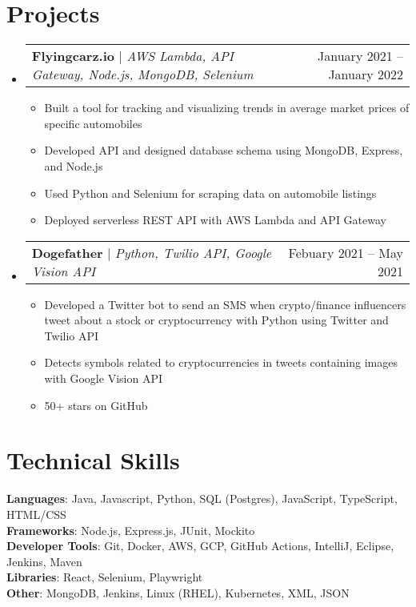 \documentclass[letterpaper,11pt]{article}
\makeatletter
\newcommand{\resumeItem}[1]{
  \item\small{
    {#1 \vspace{-2pt}}
  }
}
\newcommand{\resumeProjectHeading}[2]{
    \item
    \begin{tabular*}{0.97\textwidth}{l@{\extracolsep{\fill}}r}
      \small#1 & #2 \\
    \end{tabular*}\vspace{-7pt}
}
\newcommand{\resumeSubHeadingListStart}{\begin{itemize}[leftmargin=0.15in, label={}]}
\newcommand{\resumeSubHeadingListEnd}{\end{itemize}}
\newcommand{\resumeItemListStart}{\begin{itemize}}
\newcommand{\resumeItemListEnd}{\end{itemize}\vspace{-5pt}}
\makeatother
\begin{document}
\section{Projects}
    \resumeSubHeadingListStart
      \resumeProjectHeading
          {\textbf{Flyingcarz.io} $|$ \emph{AWS Lambda, API Gateway, Node.js, MongoDB, Selenium}}{January 2021 -- January 2022}
          \resumeItemListStart
            \resumeItem{Built a tool for tracking and visualizing trends in average market prices of specific automobiles}
            \resumeItem{Developed API and designed database schema using MongoDB, Express, and Node.js}
            \resumeItem{Used Python and Selenium for scraping data on automobile listings}
            \resumeItem{Deployed serverless REST API with AWS Lambda and API Gateway}
          \resumeItemListEnd
      \resumeProjectHeading
          {\textbf{Dogefather} $|$ \emph{Python, Twilio API, Google Vision API}}{Febuary 2021 -- May 2021}
          \resumeItemListStart
            \resumeItem{Developed a Twitter bot to send an SMS when crypto/finance influencers tweet about a stock or
            cryptocurrency with Python using Twitter and Twilio API}
            \resumeItem{Detects symbols related to cryptocurrencies in tweets containing images with Google Vision API}
            \resumeItem{50+ stars on GitHub}
          \resumeItemListEnd
    \resumeSubHeadingListEnd



%
\section{Technical Skills}
 \begin{itemize}[leftmargin=0.15in, label={}]
    \small{\item{
     \textbf{Languages}{: Java, Javascript, Python, SQL (Postgres), JavaScript, TypeScript, HTML/CSS} \\
     \textbf{Frameworks}{: Node.js, Express.js, JUnit, Mockito} \\
     \textbf{Developer Tools}{: Git, Docker, AWS, GCP, GitHub Actions, IntelliJ, Eclipse, Jenkins, Maven} \\
     \textbf{Libraries}{: React, Selenium, Playwright} \\
     \textbf{Other}{: MongoDB, Jenkins, Linux (RHEL), Kubernetes, XML, JSON}
    }}
 \end{itemize}


\end{document}
